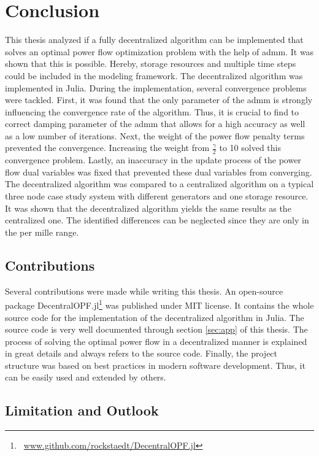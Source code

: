 \section{Conclusion}

This thesis analyzed if a fully decentralized algorithm can be implemented that solves an optimal power flow optimization problem with the help of \gls{admm}. It was shown that this is possible. Hereby, storage resources and multiple time steps could be included in the modeling framework. The decentralized algorithm was implemented in Julia. During the implementation, several convergence problems were tackled. First, it was found that the only parameter of the \gls{admm} is strongly influencing the convergence rate of the algorithm. Thus, it is crucial to find to correct damping parameter of the \gls{admm} that allows for a high accuracy as well as a low number of iterations. Next, the weight of the power flow penalty terms prevented the convergence. Increasing the weight from $\frac{\gamma}{2}$ to 10 solved this convergence problem. Lastly, an inaccuracy in the update process of the power flow dual variables was fixed that prevented these dual variables from converging. The decentralized algorithm was compared to a centralized algorithm on a typical three node case study system with different generators and one storage resource. It was shown that the decentralized algorithm yields the same results as the centralized one. The identified differences can be neglected since they are only in the per mille range.

\subsection{Contributions}

Several contributions were made while writing this thesis. An open-source package DecentralOPF.jl\footnote{~\url{www.github.com/rockstaedt/DecentralOPF.jl}} was published under MIT license. It contains the whole source code for the implementation of the decentralized algorithm in Julia. The source code is very well documented through section \ref{sec:app} of this thesis. The process of solving the optimal power flow in a decentralized manner is explained in great details and always refers to the source code. Finally, the project structure was based on best practices in modern software development. Thus, it can be easily used and extended by others.

\subsection{Limitation and Outlook}

